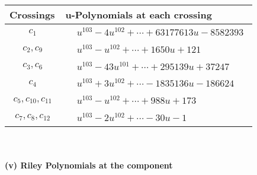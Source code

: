 \documentclass[1p]{elsarticle_modified}
\theoremstyle{definition}
\begin{document}
\begin{tabular}{m{50pt}|m{274pt}}
Crossings & \hspace{64pt}u-Polynomials at each crossing \\
\hline $$\begin{aligned}c_{1}\end{aligned}$$&$\begin{aligned}
&u^{103}-4 u^{102}+\cdots+63177613 u-8582393
\end{aligned}$\\
\hline $$\begin{aligned}c_{2},c_{9}\end{aligned}$$&$\begin{aligned}
&u^{103}- u^{102}+\cdots+1650 u+121
\end{aligned}$\\
\hline $$\begin{aligned}c_{3},c_{6}\end{aligned}$$&$\begin{aligned}
&u^{103}-43 u^{101}+\cdots+295139 u+37247
\end{aligned}$\\
\hline $$\begin{aligned}c_{4}\end{aligned}$$&$\begin{aligned}
&u^{103}+3 u^{102}+\cdots-1835136 u-186624
\end{aligned}$\\
\hline $$\begin{aligned}c_{5},c_{10},c_{11}\end{aligned}$$&$\begin{aligned}
&u^{103}- u^{102}+\cdots+988 u+173
\end{aligned}$\\
\hline $$\begin{aligned}c_{7},c_{8},c_{12}\end{aligned}$$&$\begin{aligned}
&u^{103}-2 u^{102}+\cdots-30 u-1
\end{aligned}$\\
\hline
\end{tabular}\\~\\
\newpage\renewcommand{\arraystretch}{1}
\flushleft \textbf{(v) Riley Polynomials at the component}\newline \\
\end{document}
